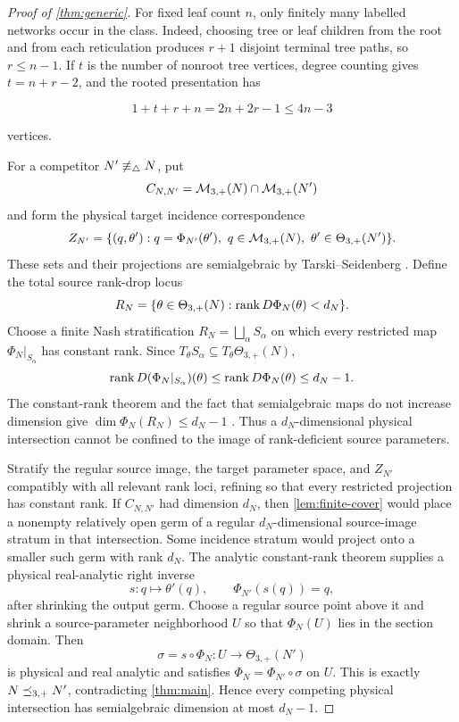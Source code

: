 \begin{proof}[Proof of \cref{thm:generic}]
For fixed leaf count \(n\), only finitely many labelled networks occur in the
class.  Indeed, choosing tree or leaf children from the root and from each
reticulation produces \(r+1\) disjoint terminal tree paths, so \(r\le n-1\).
If \(t\) is the number of nonroot tree vertices, degree counting gives
\(t=n+r-2\), and the rooted presentation has

\[
 1+t+r+n=2n+2r-1\le4n-3
\]

vertices.

For a competitor \(N'\not\equiv_\triangle N\), put
\[
 C_{N,N'}=\mathcal M_{3,+}(N)\cap\mathcal M_{3,+}(N')
\]
and form the physical target incidence correspondence
\[
 Z_{N'}=\{(q,\theta'):
 q=\Phi_{N'}(\theta'),\ q\in\mathcal M_{3,+}(N),\
 \theta'\in\Theta_{3,+}(N')\}.
\]
These sets and their projections are semialgebraic by Tarski--Seidenberg
\cite[Theorem~2.2.1]{BochnakCosteRoy1998}.  Define the total source rank-drop
locus
\[
 R_N=\{\theta\in\Theta_{3,+}(N):
 \operatorname{rank} D\Phi_N(\theta)<d_N\}.
\]
Choose a finite Nash stratification
\(R_N=\bigsqcup_\alpha S_\alpha\) on which every restricted map
\(\Phi_N|_{S_\alpha}\) has constant rank.  Since
\(T_\theta S_\alpha\subseteq T_\theta\Theta_{3,+}(N)\),
\[
 \operatorname{rank} D(\Phi_N|_{S_\alpha})(\theta)
 \le \operatorname{rank} D\Phi_N(\theta)\le d_N-1.
\]
The constant-rank theorem and the fact that semialgebraic maps do not
increase dimension give
\(\dim\Phi_N(R_N)\le d_N-1\)
\cite[Theorem~2.8.8]{BochnakCosteRoy1998}.  Thus a
\(d_N\)-dimensional physical intersection cannot be confined to the image of
rank-deficient source parameters.

Stratify the regular source image, the target parameter space, and
\(Z_{N'}\) compatibly with all relevant rank loci, refining so that every
restricted projection has constant rank.  If \(C_{N,N'}\) had dimension
\(d_N\), then \cref{lem:finite-cover} would place a nonempty relatively open
germ of a regular \(d_N\)-dimensional source-image stratum in that
intersection.  Some incidence stratum would project onto a smaller such germ
with rank \(d_N\).  The analytic constant-rank theorem supplies a physical
real-analytic right inverse
\[
 s:q\longmapsto\theta'(q),\qquad
 \Phi_{N'}(s(q))=q,
\]
after shrinking the output germ.  Choose a regular source point above it and
shrink a source-parameter neighborhood \(U\) so that \(\Phi_N(U)\) lies in
the section domain.  Then
\[
 \sigma=s\circ\Phi_N:U\longrightarrow\Theta_{3,+}(N')
\]
is physical and real analytic and satisfies
\(\Phi_N=\Phi_{N'}\circ\sigma\) on \(U\).  This is exactly
\(N\preceq_{3,+} N'\), contradicting \cref{thm:main}.  Hence every competing
physical intersection has semialgebraic dimension at most \(d_N-1\).


\end{proof}
